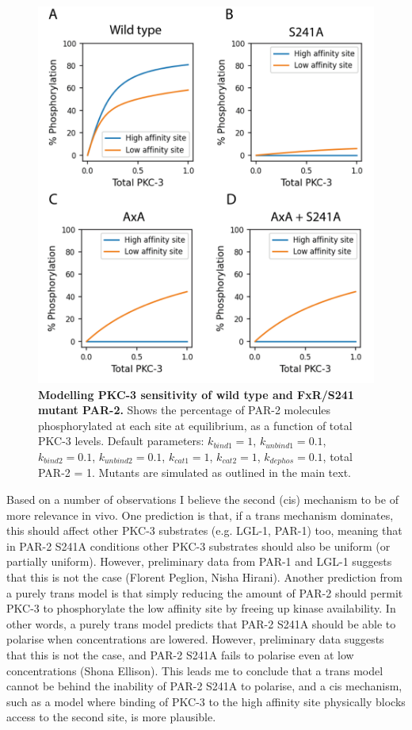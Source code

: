 \documentclass[12pt]{"report"}
\newcommand{\mycaption}[2]{\caption[#1]{\textbf{#1.} #2}}
\begin{document}
\begin{figure}
\includegraphics[scale=0.9]{fxr_simulations}
\centering
\mycaption{Modelling PKC-3 sensitivity of wild type and FxR/S241 mutant PAR-2}{
Shows the percentage of PAR-2 molecules phosphorylated at each site at equilibrium, as a function of total PKC-3 levels. Default parameters: $k_{bind1} = 1$, $k_{unbind1} = 0.1$, $k_{bind2} = 0.1$, $k_{unbind2} = 0.1$, $k_{cat1} = 1$, $k_{cat2} = 1$, $k_{dephos} = 0.1$, total PAR-2 = 1. Mutants are simulated as outlined in the main text.}
\label{fig:fxr_simulations}
\end{figure}

Based on a number of observations I believe the second (cis) mechanism to be of more relevance in vivo. One prediction is that, if a trans mechanism dominates, this should affect other PKC-3 substrates (e.g. LGL-1, PAR-1) too, meaning that in PAR-2 S241A conditions other PKC-3 substrates should also be uniform (or partially uniform). However, preliminary data from PAR-1 and LGL-1 suggests that this is not the case (Florent Peglion, Nisha Hirani). Another prediction from a purely trans model is that simply reducing the amount of PAR-2 should permit PKC-3 to phosphorylate the low affinity site by freeing up kinase availability. In other words, a purely trans model predicts that PAR-2 S241A should be able to polarise when concentrations are lowered. However, preliminary data suggests that this is not the case, and PAR-2 S241A fails to polarise even at low concentrations (Shona Ellison). This leads me to conclude that a trans model cannot be behind the inability of PAR-2 S241A to polarise, and a cis mechanism, such as a model where binding of PKC-3 to the high affinity site physically blocks access to the second site, is more plausible.\\
\end{document}
